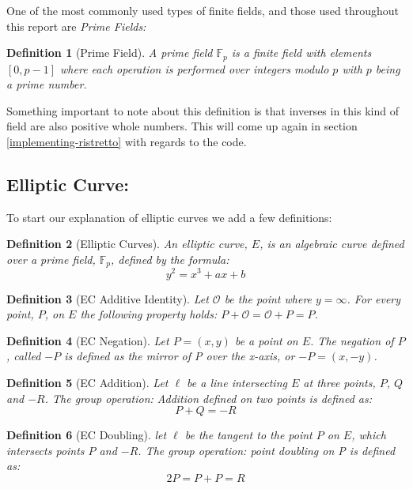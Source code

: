 \documentclass{article}
\newtheorem{definition}{Definition}[section]
\renewcommand{\O}{\mathcal{O}}
\newcommand{\F}{\mathbb{F}}
\begin{document}
One of the most commonly used types of finite fields, and those used
throughout this report are \textit{Prime Fields:} 

\begin{definition}[Prime Field]
	A prime field $\F_p$ is a finite field with elements $[0,p-1]$
	where each operation is performed over integers modulo $p$
	with $p$ being a prime number.
\end{definition}

Something important to note about this definition is that inverses in
this kind of field are also positive whole numbers. This will come up
again in section \ref{implementing-ristretto} with regards to the code.

\subsection{Elliptic Curve:}\label{elliptic-curves}

To start our explanation of elliptic curves we add a few definitions:

\begin{definition}[Elliptic Curves]
	An elliptic curve, $E$, is an algebraic curve defined over a
	prime field, $\F_p$, defined by the formula:
	$$y^2 = x^3 + ax + b$$
\end{definition}

\begin{definition}[EC Additive Identity]
	Let $\O$ be the point where $y = \infty$. For every point, $P$,
	on $E$ the following property holds:
	$P + \O = \O + P = P$.
\end{definition}

\begin{definition}[EC Negation]
	Let $P = (x,y)$ be a point on $E$. The negation of $P$, called $-P$
	is defined as the mirror of P over the x-axis, or $-P = (x,-y)$.
\end{definition}

\begin{definition}[EC Addition]
	Let $\ell$ be a line intersecting $E$ at three points, $P$, $Q$ and
	$-R$. The group operation: Addition defined on two points is defined
	as:
	$$P + Q = {-R}$$
\end{definition}

\begin{definition}[EC Doubling]
	let $\ell$ be the tangent to the point $P$ on $E$, which intersects
	points $P$ and $-R$. The group operation: point doubling on P is
	defined as:
	$$2P = P + P = R$$
\end{definition}
\end{document}
